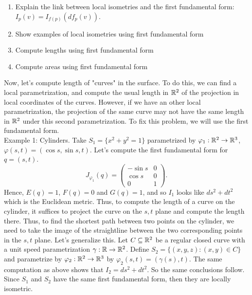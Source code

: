 \begin{enumerate}
    \item Explain the link between local isometries and the first fundamental form: $I_p(v) = I_{f(p)}(df_p(v))$.
    \item Show examples of local isometries using first fundamental form
    \item Compute lengths using first fundamental form 
    \item Compute areas using first fundamental form 
\end{enumerate}

\td 

Now, let's compute length of "curves" in the surface. To do this, we can find a local parametrization, and compute the usual length in $\mathbb{R}^2$ of the projection in local coordinates of the curves. However, if we have an other local parametrization, the projection of the same curve may not have the same length in $\mathbb{R}^2$ under this second parametrization. To fix this problem, we will use the first fundamental form.\\

Example 1: Cylinders. Take $S_1 = \{x^2 + y^2 = 1\}$ parametrized by $\varphi_1 : \mathbb{R}^2 \to \mathbb{R}^3$, $\varphi(s,t) = (\cos s, \sin s, t)$. Let's compute the first fundamental form for $q = (s,t)$.
$$J_{\varphi_1}(q) = \begin{pmatrix}
    -\sin s & 0 \\
    \cos s & 0 \\
    0 & 1
\end{pmatrix}.$$
Hence, $E(q) = 1$, $F(q) = 0$ and $G(q) = 1$, and so $I_1$ looks like $ds^2 + dt^2$ which is the Euclidean metric. Thus, to compute the length of a curve on the cylinder, it suffices to project the curve on the $s,t$ plane and compute the length there. Thus, to find the shortest path between two points on the cylinder, we need to take the image of the straightline between the two corresponding points in the $s,t$ plane. Let's generalize this. Let $C \subseteq \mathbb{R}^2$ be a regular closed curve with a unit speed parametrization $\gamma : \mathbb{R} \to \mathbb{R}^2$. Define $S_2 = \{(x,y,z) : (x,y) \in C\}$ and parametrize by $\varphi_2 : \mathbb{R}^2 \to \mathbb{R}^3$ by $\varphi_2(s,t) = (\gamma(s), t)$. The same computation as above shows that $I_2 = ds^2 + dt^2$. So the same conclusions follow. Since $S_1$ and $S_2$ have the same first fundamental form, then they are locally isometric.

